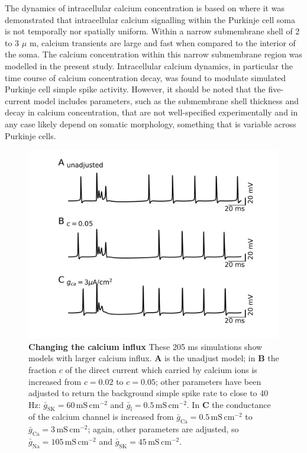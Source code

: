 \documentclass[twocolumn]{svjour3}          %
\newcommand{\msi}{\,\mathrm{mS\,cm^{-2}}}
\newcommand{\ca}{\mathrm{Ca}}
\newcommand{\na}{\mathrm{Na}}
\newcommand{\sk}{\mathrm{SK}}
\newcommand{\leak}{\mathrm{l}}
\begin{document}
The dynamics of intracellular calcium concentration is based on
\citet{EilersEtAl1995} where it was demonstrated that intracellular
calcium signalling within the Purkinje cell soma is not temporally nor
spatially uniform. Within a narrow submembrane shell of 2 to 3 $\mu$
m, calcium transients are large and fast when compared to the interior
of the soma. The calcium concentration within this narrow submembrane
region was modelled in the present study. Intracellular calcium
dynamics, in particular the time course of calcium concentration
decay, was found to modulate simulated Purkinje cell simple spike
activity. However, it should be noted that the five-current model
includes parameters, such as the submembrane shell thickness and decay
in calcium concentration, that are not well-specified experimentally
and in any case likely depend on somatic morphology, something that is
variable across Purkinje cells. 

\begin{figure}[!ht]
\includegraphics[width=\linewidth]{figure_c.jpg}
\caption{\textbf{Changing the calcium influx} These 205 ms simulations
  show models with larger calcium influx. \textbf{A} is the unadjust
  model; in \textbf{B} the fraction $c$ of the direct current which
  carried by calcium ions is increased from $c=0.02$ to $c=0.05$;
  other parameters have been adjusted to return the background simple
  spike rate to close to 40 Hz: $\bar{g}_\sk=60\msi$ and
  $\bar{g}_\leak=0.5\msi$. In \textbf{C} the conductance of the
  calcium channel is increased from $\bar{g}_\ca=0.5\msi$ to
  $\bar{g}_\ca=3\msi$; again, other parameters are adjusted, so
  $\bar{g}_\na=105\msi$ and $\bar{g}_\sk=45\msi$.}
\label{Fig_c}
\end{figure}
\end{document}
